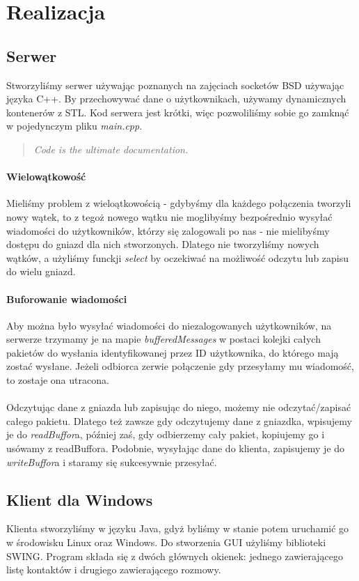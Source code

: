 \documentclass[10pt,a4paper]{article}
\begin{document}
\section{Realizacja}
	\subsection{Serwer}Stworzyliśmy serwer używając poznanych na zajęciach socketów BSD używając języka C++.
	By przechowywać dane o użytkownikach, używamy dynamicznych kontenerów z STL.
	Kod serwera jest krótki, więc pozwoliliśmy sobie go zamknąć w pojedynczym pliku \textit{main.cpp}.
	\begin{quote}
		\textit{Code is the ultimate documentation.}
	\end{quote}
	\paragraph{Wielowątkowość}Mieliśmy problem z wieloątkowością - gdybyśmy dla każdego połączenia tworzyli
	nowy wątek, to z tegoż nowego wątku nie moglibyśmy bezpośrednio wysyłać wiadomości do użytkowników, którzy
	się zalogowali po nas - nie mielibyśmy dostępu do gniazd dla nich stworzonych. Dlatego nie tworzyliśmy nowych
	wątków, a użyliśmy funckji \textit{select} by oczekiwać na możliwość odczytu lub zapisu do wielu gniazd.
	\paragraph{Buforowanie wiadomości}Aby można było wysyłać wiadomości do niezalogowanych użytkowników, na serwerze
	trzymamy je na mapie \textit{bufferedMessages} w postaci kolejki całych pakietów do wysłania identyfikowanej przez
	ID użytkownika, do którego mają zostać wysłane. Jeżeli odbiorca zerwie połączenie gdy przesyłamy mu wiadomość, to
	zostaje ona utracona.
	\paragraph{}Odczytując dane z gniazda lub zapisując do niego, możemy nie odczytać/zapisać całego pakietu.
	Dlatego też zawsze gdy odczytujemy dane z gniazdka, wpisujemy je do \textit{readBuffor}a, później zaś, gdy
	odbierzemy cały pakiet, kopiujemy go i usówamy z readBuffora. Podobnie, wysyłając dane do klienta, zapisujemy je do
	\textit{writeBuffor}a i staramy się sukcesywnie przesyłać.
	
	\subsection{Klient dla Windows}Klienta stworzyliśmy w języku Java, gdyż byliśmy w stanie potem uruchamić go w środowisku
	Linux oraz Windows. Do stworzenia GUI użyliśmy biblioteki SWING. Program składa się z dwóch głównych okienek: jednego 
	zawierającego listę kontaktów i drugiego zawierającego rozmowy.
\end{document}
